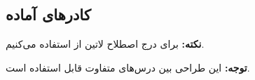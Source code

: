 \subsection*{کادرهای آماده}
\begin{HWTip}
\textbf{نکته:} برای درج اصطلاح لاتین از  استفاده می‌کنیم.
\end{HWTip}
\begin{HWWarning}
\textbf{توجه:} این طراحی بین درس‌های متفاوت قابل استفاده است.
\end{HWWarning}
